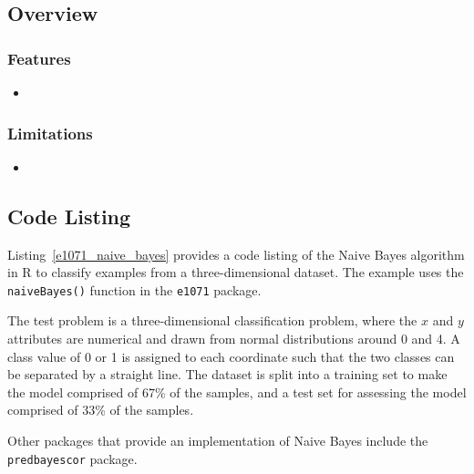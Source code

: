 \subsection{Overview}

\subsubsection{Features}

\begin{itemize}
	\item 
\end{itemize}

\subsubsection{Limitations}

\begin{itemize}
	\item 
\end{itemize}


\subsection{Code Listing}
Listing~\ref{e1071_naive_bayes} provides a code listing of the Naive Bayes algorithm in R to classify examples from a three-dimensional dataset.
The example uses the \texttt{naiveBayes()} function in the \texttt{e1071} package.

The test problem is a three-dimensional classification problem, where the $x$ and $y$ attributes are numerical and drawn from normal distributions around 0 and 4. A class value of 0 or 1 is assigned to each coordinate such that the two classes can be separated by a straight line. The dataset is split into a training set to make the model comprised of 67\% of the samples, and a test set for assessing the model comprised of 33\% of the samples.



Other packages that provide an implementation of Naive Bayes include the \texttt{predbayescor} package.


